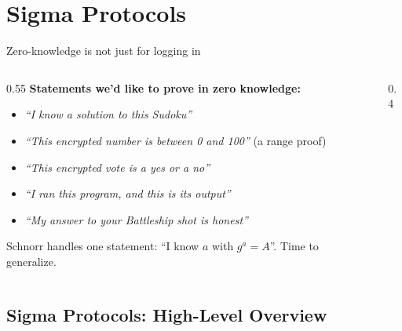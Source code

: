 \ifdefined\PRESENTATION\else\PassOptionsToClass{handout}{beamer}\fi\documentclass[aspectratio=169, lualatex]{beamer}
\begin{document}
\section{Sigma Protocols}

\begin{frame}{Zero-knowledge is not just for logging in}
	\begin{columns}[c]
		\begin{column}{0.55\textwidth}
			\textbf{Statements we'd like to prove in zero knowledge:}
			\begin{itemize}
				\item \textit{``I know a solution to this Sudoku''}
				\item \textit{``This encrypted number is between 0 and 100''} (a range proof)
				\item \textit{``This encrypted vote is a yes or a no''}
				\item \textit{``I ran this program, and this is its output''}
				\item \textit{``My answer to your Battleship shot is honest''}
			\end{itemize}
			\vspace{0.2cm}
			Schnorr handles one statement: ``I know $a$ with $g^a = A$''. Time to generalize.
		\end{column}
		\begin{column}{0.4\textwidth}
		\end{column}
	\end{columns}
\end{frame}

\subsection{Sigma Protocols: High-Level Overview}
\end{document}
